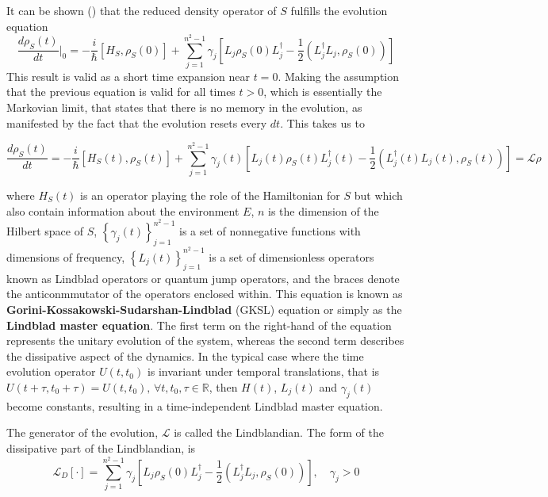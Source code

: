 It can be shown (\cite{lidar2019lecture}) that the reduced density operator of $S$ fulfills the evolution equation 
\begin{equation}
    \frac{d \rho_S(t)}{d t}|_{0} = -\frac{i}{\hbar}\left[ H_S, \rho_S(0)\right] + \sum_{j=1}^{n^2-1}\gamma_j \left[ L_j\rho_S(0) L_j^{\dag} - \frac{1}{2}(L_j^{\dag}L_j, \rho_S(0) )\right]
\end{equation}
This result is valid as a short time expansion near $t=0$. Making the assumption that the previous equation is valid for all times $t>0$, which is essentially the Markovian limit, that states that there is no memory in the evolution, as manifested by the fact that the evolution resets every $dt$. This takes us to

\begin{equation}
    \frac{d \rho_S(t)}{d t} = -\frac{i}{\hbar}\left[ H_S(t), \rho_S(t)\right] + \sum_{j=1}^{n^2-1}\gamma_j(t) \left[ L_j(t) \rho_S(t) L_j^{\dag}(t) - \frac{1}{2}(L_j^{\dag}(t)L_j(t), \rho_S(t) )\right] = \mathcal{L}\rho
\end{equation}
 
where $H_S(t)$ is an operator playing the role of the Hamiltonian for $S$ but which also contain information about the environment $E$, $n$ is the dimension of the Hilbert space of $S$, $\left\lbrace \gamma_j(t) \right\rbrace_{j=1}^{n^2-1}$ is a set of nonnegative functions with dimensions of frequency, $\left\lbrace L_j(t) \right\rbrace_{j=1}^{n^2-1}$ is a set of dimensionless operators known as Lindblad operators or quantum jump operators, and the braces denote the anticonmmutator of the operators enclosed within. This equation is known as \textbf{Gorini-Kossakowski-Sudarshan-Lindblad} (GKSL) equation or simply as the \textbf{Lindblad master equation}. The first term on the right-hand of the equation represents the unitary evolution of the system, whereas the second term describes the dissipative aspect of the dynamics. In the typical case where the time evolution operator $U(t,t_0)$ is invariant under temporal translations, that is $U(t+ \tau, t_0 + \tau) =U(t,t_0), \, \forall t,t_0,\tau \in\mathbb{R}$, then $H(t)$, $L_j(t)$ and $\gamma_j(t)$ become constants, resulting in a time-independent Lindblad master equation.

The generator of the evolution, $\mathcal{L}$ is called the Lindblandian. The form of the dissipative part of the Lindblandian, is 
$$\mathcal{L}_D[\cdot] = \sum_{j=1}^{n^2-1}\gamma_j \left[ L_j\rho_S(0) L_j^{\dag} - \frac{1}{2}(L_j^{\dag}L_j, \rho_S(0) )\right], \quad \gamma_j >0$$

